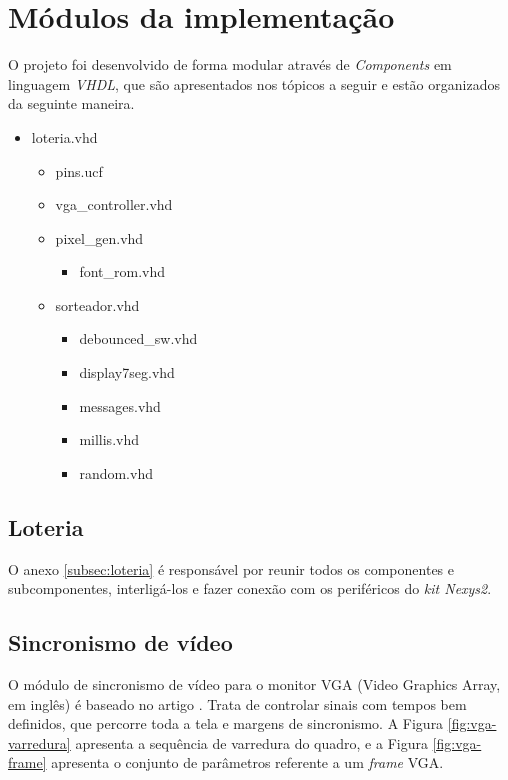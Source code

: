 \documentclass[12pt]{article}
\begin{document}
\clearpage
\section{Módulos da implementação}
O projeto foi desenvolvido de forma modular através de \emph{Components} em linguagem \emph{VHDL}, que são apresentados nos tópicos a seguir e estão organizados da seguinte maneira.

\begin{itemize}
    \item loteria.vhd
        \begin{itemize}
        \item pins.ucf
        \item vga\_controller.vhd
        \item pixel\_gen.vhd
            \begin{itemize}
            \item font\_rom.vhd
            \end{itemize}
        \item sorteador.vhd
            \begin{itemize}
            \item debounced\_sw.vhd
            \item display7seg.vhd
            \item messages.vhd
            \item millis.vhd
            \item random.vhd
            \end{itemize}
        \end{itemize}
\end{itemize}

\subsection{Loteria}
O anexo \ref{subsec:loteria} é responsável por reunir todos os componentes e subcomponentes, interligá-los e fazer conexão com os periféricos do \emph{kit Nexys2}.

\subsection{Sincronismo de vídeo}
O módulo de sincronismo de vídeo para o monitor VGA (Video Graphics Array, em inglês) é baseado no artigo \cite{vga-sync}. Trata de controlar sinais com tempos bem definidos, que percorre toda a tela e margens de sincronismo. A Figura \ref{fig:vga-varredura} apresenta a sequência de varredura do quadro, e a Figura \ref{fig:vga-frame} apresenta o conjunto de parâmetros referente a um \emph{frame} VGA.
\end{document}
